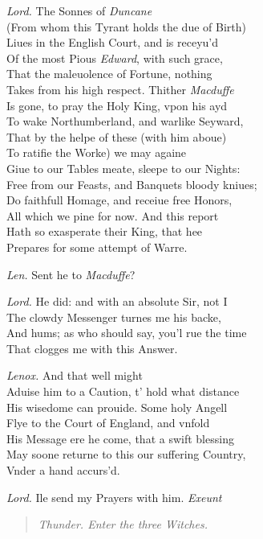 \documentclass[12pt]{sides}
\newcommand{\StageDir}[1]{\begin{quote}\centering\em #1\end{quote}}
\newcommand{\elStageDir}[1]{\hfill\textit{#1}}
\newcommand{\dia}[1]{\hskip 15pt\textit{#1}\hskip 6pt}
\begin{document}
\begin{multicols}{2}
            \dia{Lord.} The Sonnes of \textit{Duncane} \\ (From whom this Tyrant holds the due of Birth) \\ Liues in the English Court, and is receyu'd \\ Of the most Pious \textit{Edward}, with such grace, \\ That the maleuolence of Fortune, nothing \\ Takes from his high respect. Thither \textit{Macduffe} \\ Is gone, to pray the Holy King, vpon his ayd \\ To wake Northumberland, and warlike Seyward, \\ That by the helpe of these (with him aboue) \\ To ratifie the Worke) we may againe \\ Giue to our Tables meate, sleepe to our Nights: \\ Free from our Feasts, and Banquets bloody kniues; \\ Do faithfull Homage, and receiue free Honors, \\ All which we pine for now. And this report \\ Hath so exasperate their King, that hee \\ Prepares for some attempt of Warre.

            \dia{Len.} Sent he to \textit{Macduffe}?

            \dia{Lord.} He did: and with an absolute Sir, not I \\ The clowdy Messenger turnes me his backe, \\ And hums; as who should say, you'l rue the time \\ That clogges me with this Answer.

            \dia{Lenox.} And that well might \\ Aduise him to a Caution, t' hold what distance \\ His wisedome can prouide. Some holy Angell \\ Flye to the Court of England, and vnfold \\ His Message ere he come, that a swift blessing \\ May soone returne to this our suffering Country, \\ Vnder a hand accurs'd.

            \dia{Lord.} Ile send my Prayers with him. \elStageDir{Exeunt}
            \StageDir{Thunder. \hspace{16pt} Enter the three Witches.}
            

	\end{multicols}
\end{document}
